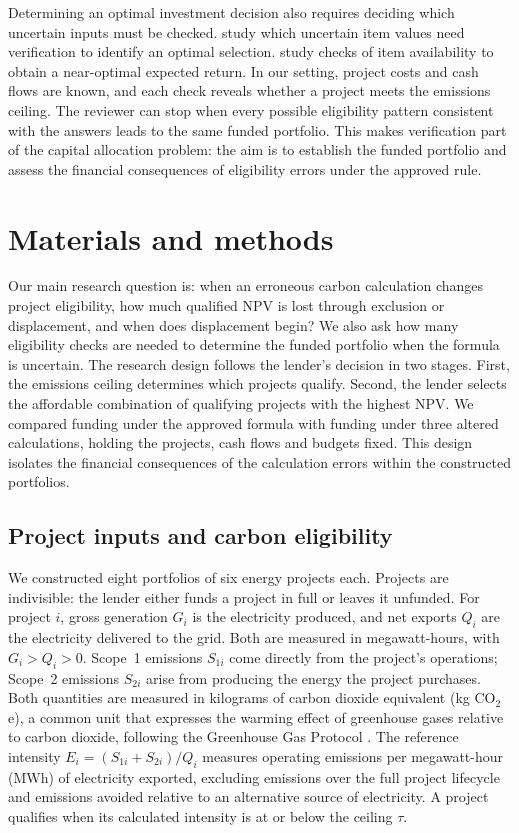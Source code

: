 Determining an optimal investment decision also requires deciding which uncertain inputs must be checked. \citet{schloter} study which uncertain item values need verification to identify an optimal selection. \citet{dughmi} study checks of item availability to obtain a near-optimal expected return. In our setting, project costs and cash flows are known, and each check reveals whether a project meets the emissions ceiling. The reviewer can stop when every possible eligibility pattern consistent with the answers leads to the same funded portfolio. This makes verification part of the capital allocation problem: the aim is to establish the funded portfolio and assess the financial consequences of eligibility errors under the approved rule.

\section{Materials and methods}
Our main research question is: when an erroneous carbon calculation changes project eligibility, how much qualified NPV is lost through exclusion or displacement, and when does displacement begin? We also ask how many eligibility checks are needed to determine the funded portfolio when the formula is uncertain. The research design follows the lender's decision in two stages. First, the emissions ceiling determines which projects qualify. Second, the lender selects the affordable combination of qualifying projects with the highest NPV. We compared funding under the approved formula with funding under three altered calculations, holding the projects, cash flows and budgets fixed. This design isolates the financial consequences of the calculation errors within the constructed portfolios.

\subsection{Project inputs and carbon eligibility}
We constructed eight portfolios of six energy projects each. Projects are indivisible: the lender either funds a project in full or leaves it unfunded. For project $i$, gross generation $G_i$ is the electricity produced, and net exports $Q_i$ are the electricity delivered to the grid. Both are measured in megawatt-hours, with $G_i>Q_i>0$. Scope~1 emissions $S_{1i}$ come directly from the project's operations; Scope~2 emissions $S_{2i}$ arise from producing the energy the project purchases. Both quantities are measured in kilograms of carbon dioxide equivalent (kg CO$_2$e), a common unit that expresses the warming effect of greenhouse gases relative to carbon dioxide, following the Greenhouse Gas Protocol \citep{ghg}. The reference intensity $E_i=(S_{1i}+S_{2i})/Q_i$ measures operating emissions per megawatt-hour (MWh) of electricity exported, excluding emissions over the full project lifecycle and emissions avoided relative to an alternative source of electricity. A project qualifies when its calculated intensity is at or below the ceiling $\tau$.

